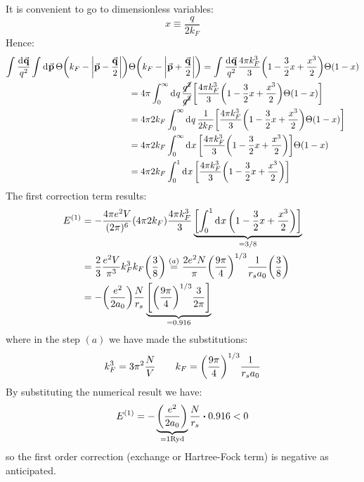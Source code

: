 \documentclass[../main/main.tex]{subfiles}
\begin{document}
It is convenient to go to dimensionless variables:
\begin{equation*}
  x \equiv \frac{q}{2k_F}
\end{equation*}
Hence:
\begin{equation*}
\begin{split}
  \int_{}^{}   \frac{\dd[]{\va{q}}}{q^2} \int_{}^{} \dd[]{\va{p}}  \Theta \qty(k_F - \abs{\va{p}-\frac{\va{q}}{2}} ) &\Theta \qty(k_F - \abs{\va{p}+ \frac{\va{q}}{2}} )  =
    \int_{}^{} \frac{\dd[]{\va{q}}}{q^2}
  \frac{4 \pi k_F^3}{3}  \qty(1 - \frac{3}{2}x + \frac{x^3}{2}) \Theta (1-x)  \\
  &= 4 \pi\int_{0}^{\infty } \dd[]{q} \frac{\cancel{q^2}}{\cancel{q^2}} \qty[
  \frac{4 \pi k_F^3}{3}  \qty(1 - \frac{3}{2}x + \frac{x^3}{2}) \Theta (1-x)] \\
  &= 4 \pi 2 k_F \int_{0}^{\infty } \dd[]{q} \frac{1}{2k_F} \qty[
  \frac{4 \pi k_F^3}{3}  \qty(1 - \frac{3}{2}x + \frac{x^3}{2}) \Theta (1-x)] \\
  & = 4 \pi  2 k_F \int_{0}^{\infty } \dd[]{x} \qty[
  \frac{4 \pi k_F^3}{3}  \qty(1 - \frac{3}{2}x + \frac{x^3}{2}) ] \Theta (1-x) \\
  & = 4 \pi  2 k_F \int_{0}^{1} \dd[]{x}  \qty[
  \frac{4 \pi k_F^3}{3}  \qty(1 - \frac{3}{2}x + \frac{x^3}{2}) ]
\end{split}
\end{equation*}
The first correction term results:
\begin{equation*}
\begin{split}
E^{(1)} &= - \frac{4 \pi e^2 V}{(2 \pi )^6} (4 \pi  2 k_F) \frac{4 \pi k_F^3}{3} \underbrace{\qty[ \int_{0}^{1} \dd[]{x}   \qty(1 - \frac{3}{2}x + \frac{x^3}{2})  ]}_{= 3/8}   \\
& = \frac{2}{3} \frac{e^2V}{\pi ^3}k_F^3 k_F \qty(\frac{3}{8})
\overset{(a)}{=} \frac{2 e^2 N}{\pi } \qty(\frac{9 \pi }{4})^{1/3} \frac{1}{r_s a_0} \qty(\frac{3}{8}) \\
&= - \qty(\frac{e^2}{2 a_0}) \frac{N}{r_s} \underbrace{\qty[\qty(\frac{9 \pi }{4})^{1/3} \frac{3}{2 \pi } ]  }_{=0.916}
\end{split}
\end{equation*}
where in the step \( (a) \) we have made the substitutions:
\begin{equation*}
  k_F^3 = 3 \pi ^2 \frac{N}{V} \quad \quad k_F = \qty(\frac{9 \pi }{4})^{1/3} \frac{1}{r_s a_0}
\end{equation*}
By substituting the numerical result we have:
\begin{equation}
  E^{(1)} = - \underbrace{\qty(\frac{e^2}{2 a_0})}_{=1 \text{Ryd}}  \frac{N}{r_s} \vdot 0.916 < 0
\end{equation}
so the first order correction (exchange or Hartree-Fock term) is negative as anticipated.
\end{document}
